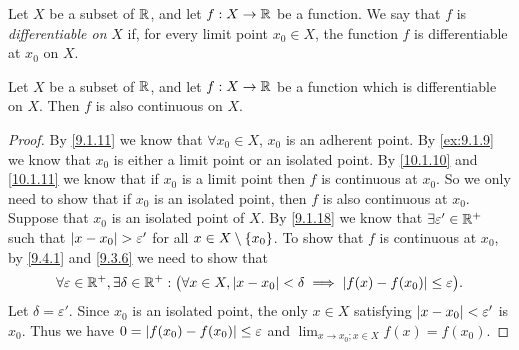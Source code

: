 \begin{defn}\label{10.1.11}
  Let \(X\) be a subset of \(\mathbb{R}\), and let \(f : X \to \mathbb{R}\) be a function.
  We say that \(f\) is \emph{differentiable on} \(X\) if, for every limit point \(x_0 \in X\), the function \(f\) is differentiable at \(x_0\) on \(X\).
\end{defn}

\begin{cor}\label{10.1.12}
  Let \(X\) be a subset of \(\mathbb{R}\), and let \(f : X \to \mathbb{R}\) be a function which is differentiable on \(X\).
  Then \(f\) is also continuous on \(X\).
\end{cor}

\begin{proof}
  By \cref{9.1.11} we know that \(\forall x_0 \in X\), \(x_0\) is an adherent point.
  By \cref{ex:9.1.9} we know that \(x_0\) is either a limit point or an isolated point.
  By \cref{10.1.10} and \cref{10.1.11} we know that if \(x_0\) is a limit point then \(f\) is continuous at \(x_0\).
  So we only need to show that if \(x_0\) is an isolated point, then \(f\) is also continuous at \(x_0\).
  Suppose that \(x_0\) is an isolated point of \(X\).
  By \cref{9.1.18} we know that \(\exists \varepsilon' \in \mathbb{R}^+\) such that \(\left\lvert x - x_0\right\rvert > \varepsilon'\) for all \(x \in X \setminus \left\lbrace x_0\right\rbrace\).
  To show that \(f\) is continuous at \(x_0\), by \cref{9.4.1} and \cref{9.3.6} we need to show that
  \[
    \forall \varepsilon \in \mathbb{R}^+, \exists \delta \in \mathbb{R}^+ : \big(\forall x \in X, \left\lvert x - x_0\right\rvert < \delta \implies \left\lvert f(x) - f(x_0)\right\rvert \leq \varepsilon\big).
  \]
  Let \(\delta = \varepsilon'\).
  Since \(x_0\) is an isolated point, the only \(x \in X\) satisfying \(\left\lvert x - x_0\right\rvert < \varepsilon'\) is \(x_0\).
  Thus we have \(0 = \left\lvert f(x_0) - f(x_0)\right\rvert \leq \varepsilon\) and \(\lim_{x \to x_0 ; x \in X} f(x) = f(x_0)\).
\end{proof}

